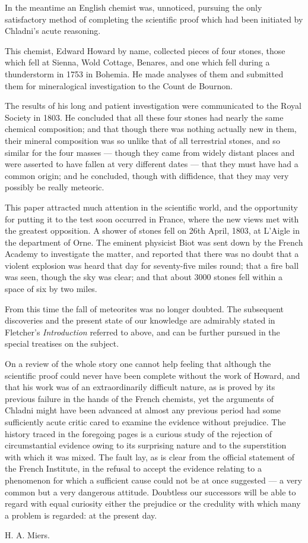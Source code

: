 \documentclass[a4paper, 12pt, oneside]{article}
\begin{document}
In the meantime an English chemist was, unnoticed, pursuing the only satisfactory method of completing the scientific proof which had been initiated by Chladni's acute reasoning.

This chemist, Edward Howard by name, collected pieces of four stones, those which fell at Sienna, Wold Cottage, Benares, and one which fell during a thunderstorm in 1753 in Bohemia. He made analyses of them and submitted them for mineralogical investigation to the Count de Bournon.

The results of his long and patient investigation were communicated to the Royal Society in 1803. He concluded that all these four stones had nearly the same chemical composition; and that though there was nothing actually new in them, their mineral composition was so unlike that of all terrestrial stones, and so similar for the four masses --- though they came from widely distant places and were asserted to have fallen at very different dates --- that they must have had a common origin; and he concluded, though with diffidence, that they may very possibly be really meteoric.

This paper attracted much attention in the scientific world, and the opportunity for putting it to the test soon occurred in France, where the new views met with the greatest opposition. A shower of stones fell on 26th April, 1803, at L'Aigle in the department of Orne. The eminent physicist Biot was sent down by the French Academy to investigate the matter, and reported that there was no doubt that a violent explosion was heard that day for seventy-five miles round; that a fire ball was seen, though the sky was clear; and that about 3000 stones fell within a space of six by two miles.

From this time the fall of meteorites was no longer doubted. The subsequent discoveries and the present state of our knowledge are admirably stated in Fletcher's \emph{Introduction} referred to above, and can be further pursued in the special treatises on the subject.

On a review of the whole story one cannot help feeling that although the scientific proof could never have been complete without the work of Howard, and that his work was of an extraordinarily difficult nature, as is proved by its previous failure in the hands of the French chemists, yet the arguments of Chladni might have been advanced at almost any previous period had some sufficiently acute critic cared to examine the evidence without prejudice. The history traced in the foregoing pages is a curious study of the rejection of circumstantial evidence owing to its surprising nature and to the superstition with which it was mixed. The fault lay, as is clear from the official statement of the French Institute, in the refusal to accept the evidence relating to a phenomenon for which a sufficient cause could not be at once suggested --- a very common but a very dangerous attitude. Doubtless our successors will be able to regard with equal curiosity either the prejudice or the credulity with which many a problem is regarded: at the present day.

\bigskip{}

H. A. Miers.
\end{document}
